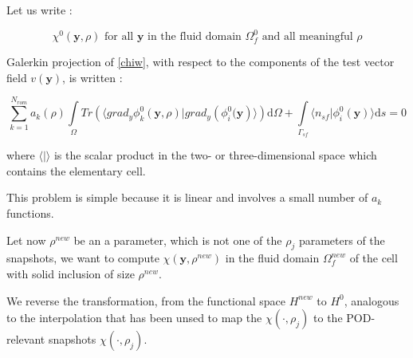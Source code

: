 \ligneinter
Let us write :

\[\chi^0\left(\mathbf{y},\rho\right)\text{ for all $\mathbf{y}$ in the fluid domain $\Omega_f^0$ and all meaningful $\rho$}\]

\par
Galerkin projection of \ref{chiw}, with respect to the components of the test vector field $v(\mathbf{y})$, is written :

\begin{equation}\label{morchiz}
\sum\limits_{k=1}^{N_{rom}} a_k(\rho)\int\limits_{\Omega}Tr\left(\langle grad_y\phi_k^0 \left(\mathbf{y},\rho\right)|grad_y\left(\phi_i^0(\mathbf{y}\right)\rangle\right)\text{d}\Omega+%
\int\limits_{\Gamma_{sf}}\langle n_{sf}|\phi_i^0(\mathbf{y})\rangle \text{d}s %
=0
\end{equation}

where $\langle |\rangle$ is the scalar product in the two- or three-dimensional space which contains the elementary cell.

\par
This problem is simple because it is linear and involves a small number of $a_k$ functions.%


\etoile
Let now $\rho^{new}$ be an a parameter, which is not one of the $\rho_j$ parameters of the snapshots, %
we want to compute $\chi(\mathbf{y},\rho^{new})$ in the fluid domain $\Omega_f^{new}$ of the cell with solid inclusion of size $\rho^{new}$.


\par
We reverse the transformation, from the functional space $H^{new}$ to $H^0$, %
analogous to the interpolation that has been unsed to map the $\chi(\cdot,\rho_j)$ to the POD-relevant snapshots $\chi (\cdot ,\rho_j)$.

